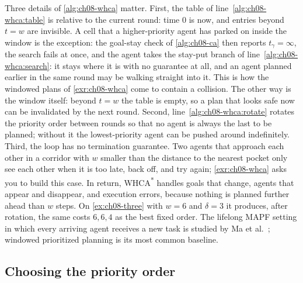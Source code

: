Three details of \cref{alg:ch08-whca} matter. First, the table of
line~\ref{alg:ch08-whca:table} is relative to the current round: time $0$ is now, and
entries beyond $t = w$ are invisible. A cell that a higher-priority agent has parked on
inside the window is the exception: the goal-stay check of \cref{alg:ch08-ca} then
reports $t_\gamma = \infty$, the search fails at once, and the agent takes the stay-put
branch of line~\ref{alg:ch08-whca:search}: it stays where it is with no guarantee at
all, and an agent planned earlier in the same round may be walking straight into it.
This is how the windowed plans of \cref{exr:ch08-whca} come to contain a collision. The
other way is the window itself: beyond $t = w$ the table is empty, so a plan that looks
safe now can be invalidated by the next round.
Second, line~\ref{alg:ch08-whca:rotate} rotates the priority order between rounds so
that no agent is always the last to be planned; without it the lowest-priority agent
can be pushed around indefinitely. Third, the loop has no termination guarantee. Two
agents that approach each other in a corridor with $w$ smaller than the distance to
the nearest pocket only see each other when it is too late, back off, and try again;
\cref{exr:ch08-whca} asks you to build this case. In return, WHCA\textsuperscript{*}
handles goals that change, agents that appear and disappear, and execution errors,
because nothing is planned further ahead than $w$ steps. On \cref{ex:ch08-three} with
$w = 6$ and $\delta = 3$ it produces, after rotation, the same costs $6, 6, 4$ as the
best fixed order. The lifelong MAPF setting in which every arriving agent receives a
new task is studied by Ma et al.~\cite{ma2017lifelong}; windowed prioritized planning
is its most common baseline.

\subsection{Choosing the priority order}
\label{sec:ch08-ordering}


